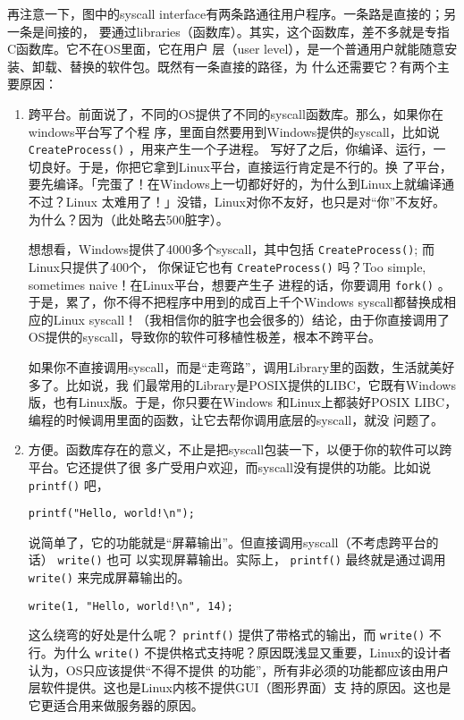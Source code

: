 \documentclass{wx672ctexart} [NO-DEFAULT-PACKAGES] \usepackage{wx672hyperref}
\begin{document}
再注意一下，图中的syscall interface有两条路通往用户程序。一条路是直接的；另一条是间接的，
要通过libraries（函数库）。其实，这个函数库，差不多就是专指C函数库。它不在OS里面，它在用户
层（user level），是一个普通用户就能随意安装、卸载、替换的软件包。既然有一条直接的路径，为
什么还需要它？有两个主要原因：
\begin{enumerate}
\item 跨平台。前面说了，不同的OS提供了不同的syscall函数库。那么，如果你在windows平台写了个程
序，里面自然要用到Windows提供的syscall，比如说 \texttt{CreateProcess()} ，用来产生一个子进程。
写好了之后，你编译、运行，一切良好。于是，你把它拿到Linux平台，直接运行肯定是不行的。换
了平台，要先编译。「完蛋了！在Windows上一切都好好的，为什么到Linux上就编译通不过？Linux
太难用了！」没错，Linux对你不友好，也只是对“你”不友好。为什么？因为（此处略去500脏字）。

想想看，Windows提供了4000多个syscall，其中包括 \texttt{CreateProcess()}; 而Linux只提供了400个，
你保证它也有 \texttt{CreateProcess()} 吗？Too simple, sometimes naive！在Linux平台，想要产生子
进程的话，你要调用 \texttt{fork()} 。于是，累了，你不得不把程序中用到的成百上千个Windows
syscall都替换成相应的Linux syscall！（我相信你的脏字也会很多的）结论，由于你直接调用了
OS提供的syscall，导致你的软件可移植性极差，根本不跨平台。

如果你不直接调用syscall，而是“走弯路”，调用Library里的函数，生活就美好多了。比如说，我
们最常用的Library是POSIX提供的LIBC，它既有Windows版，也有Linux版。于是，你只要在Windows
和Linux上都装好POSIX LIBC，编程的时候调用里面的函数，让它去帮你调用底层的syscall，就没
问题了。
\item 方便。函数库存在的意义，不止是把syscall包装一下，以便于你的软件可以跨平台。它还提供了很
多广受用户欢迎，而syscall没有提供的功能。比如说 \texttt{printf()} 吧，
\begin{verbatim}
printf("Hello, world!\n");
\end{verbatim}
说简单了，它的功能就是“屏幕输出”。但直接调用syscall（不考虑跨平台的话） \texttt{write()} 也可
以实现屏幕输出。实际上， \texttt{printf()} 最终就是通过调用 \texttt{write()} 来完成屏幕输出的。
\begin{verbatim}
write(1, "Hello, world!\n", 14);
\end{verbatim}

这么绕弯的好处是什么呢？ \texttt{printf()} 提供了带格式的输出，而 \texttt{write()} 不行。为什么
\texttt{write()} 不提供格式支持呢？原因既浅显又重要，Linux的设计者认为，OS只应该提供“不得不提供
的功能”，所有非必须的功能都应该由用户层软件提供。这也是Linux内核不提供GUI（图形界面）支
持的原因。这也是它更适合用来做服务器的原因。
\end{enumerate}
\end{document}
